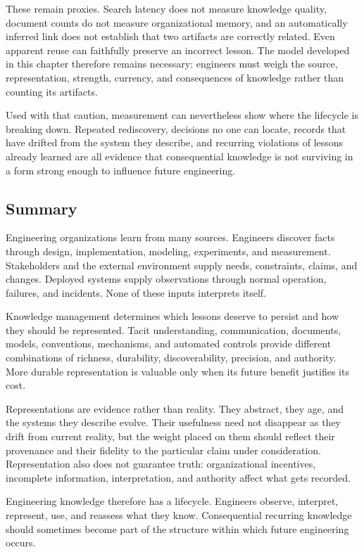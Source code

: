 These remain proxies. Search latency does not measure knowledge quality, document counts do not
measure organizational memory, and an automatically inferred link does not establish that two
artifacts are correctly related. Even apparent reuse can faithfully preserve an incorrect lesson. The
model developed in this chapter therefore remains necessary: engineers must weigh the source,
representation, strength, currency, and consequences of knowledge rather than counting its artifacts.

Used with that caution, measurement can nevertheless show where the lifecycle is breaking down.
Repeated rediscovery, decisions no one can locate, records that have drifted from the system they
describe, and recurring violations of lessons already learned are all evidence that consequential
knowledge is not surviving in a form strong enough to influence future engineering.

\subsection{Summary}\label{summary}

Engineering organizations learn from many sources. Engineers discover facts through design,
implementation, modeling, experiments, and measurement. Stakeholders and the external environment
supply needs, constraints, claims, and changes. Deployed systems supply observations through normal
operation, failures, and incidents. None of these inputs interprets itself.

Knowledge management determines which lessons deserve to persist and how they should be represented.
Tacit understanding, communication, documents, models, conventions, mechanisms, and automated
controls provide different combinations of richness, durability, discoverability, precision, and
authority. More durable representation is valuable only when its future benefit justifies its cost.

Representations are evidence rather than reality. They abstract, they age, and the systems they
describe evolve. Their usefulness need not disappear as they drift from current reality, but the
weight placed on them should reflect their provenance and their fidelity to the particular claim
under consideration. Representation also does not guarantee truth: organizational incentives,
incomplete information, interpretation, and authority affect what gets recorded.

Engineering knowledge therefore has a lifecycle. Engineers observe, interpret, represent, use, and
reassess what they know. Consequential recurring knowledge should sometimes become part of the
structure within which future engineering occurs.

